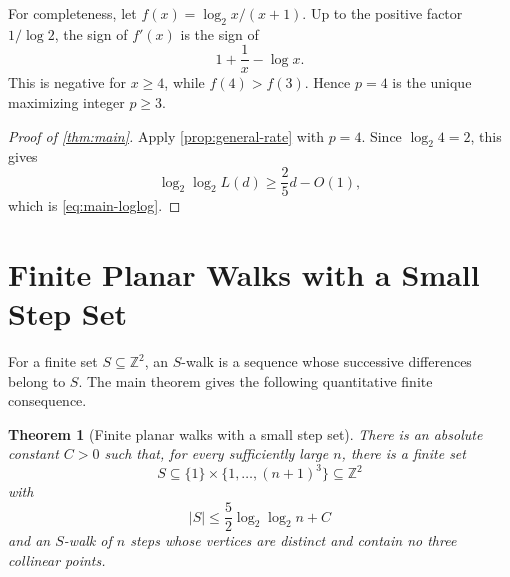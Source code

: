 \documentclass[11pt]{article}
\theoremstyle{plain}
\newtheorem{theorem}{Theorem}[section]
\theoremstyle{definition}
\theoremstyle{remark}
\newcommand{\Z}{\mathbb Z}
\begin{document}
For completeness, let \(f(x)=\log_2x/(x+1)\). Up to the positive factor \(1/\log 2\), the sign of \(f'(x)\) is the sign of
\[
        1+\frac1x-\log x.
\]
This is negative for \(x\ge4\), while \(f(4)>f(3)\). Hence \(p=4\) is the unique maximizing integer \(p\ge3\).

\begin{proof}[Proof of \cref{thm:main}]
Apply \cref{prop:general-rate} with $p=4$. Since $\log_2 4=2$, this gives
\[
        \log_2\log_2 L(d)\ge \frac{2}{5}d-O(1),
\]
which is \eqref{eq:main-loglog}. 
\end{proof}

\section{Finite Planar Walks with a Small Step Set}\label{sec:planar}

For a finite set \(S\subseteq\Z^2\), an \(S\)-walk is a sequence whose successive differences belong to \(S\). The main theorem gives the following quantitative finite consequence.

\begin{theorem}[Finite planar walks with a small step set]\label{thm:swalk-projection}
There is an absolute constant \(C>0\) such that, for every sufficiently large \(n\), there is a finite set
\begin{equation}\label{eq:step-set-box}
        S\subseteq
        \{1\}\times\{1,\ldots,(n+1)^3\}
        \subseteq\Z^2
\end{equation}
with
\begin{equation}\label{eq:step-set-size}
        |S|\le \frac{5}{2}\log_2\log_2 n+C
\end{equation}
and an \(S\)-walk of \(n\) steps whose vertices are distinct and contain no three collinear points.
\end{theorem}
\end{document}
